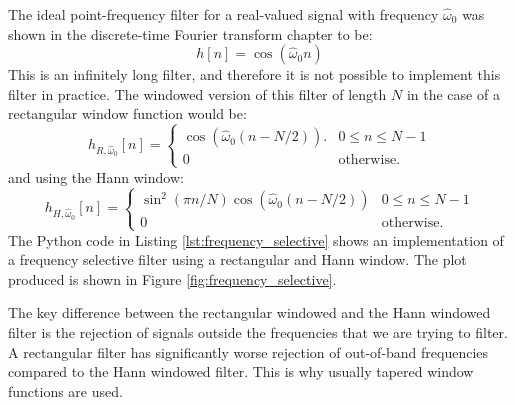 The ideal point-frequency filter for a real-valued signal with frequency
$\hat{\omega}_0$ was shown in the discrete-time Fourier transform
chapter to be:
\begin{equation}
  h[n] = \cos(\hat{\omega}_0 n)
\end{equation}
This is an infinitely long filter, and therefore it is not possible to
implement this filter in practice. The windowed version of this filter
of length $N$ in the case of a rectangular window function would be:
\begin{equation}
  h_{R,\hat{\omega}_0}[n] =\left\{ \begin{array}{cc}
    \cos(\hat{\omega}_0 (n-N/2)). & 0 \le n \le N-1     \\
    0                             & \mathrm{otherwise}.
  \end{array}
  \right.
\end{equation}
and using the Hann window:
\begin{equation}
  h_{H,\hat{\omega}_0}[n] =\left\{ \begin{array}{cc}
    \sin^2(\pi n/N)\cos(\hat{\omega}_0 (n-N/2)) & 0\le n \le N-1      \\
    0                                           & \mathrm{otherwise}.
  \end{array}
  \right.
\end{equation}
The Python code in Listing \ref{lst:frequency_selective} shows an
implementation of a frequency selective filter using a rectangular and
Hann window. The plot produced is shown in Figure
\ref{fig:frequency_selective}.

The key difference between the rectangular windowed and the Hann
windowed filter is the rejection of signals outside the frequencies that
we are trying to filter. A rectangular filter has significantly worse
rejection of out-of-band frequencies compared to the Hann windowed
filter. This is why usually tapered window functions are used.

